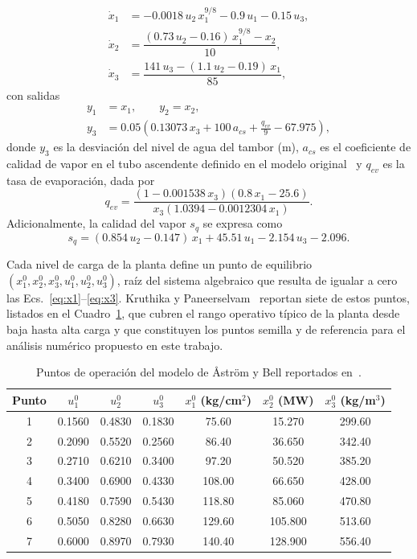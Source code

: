 \documentclass[final,5p,times,twocolumn,authoryear,11pt]{elsarticle}
\begin{document}
\begin{align}
\dot{x}_1 &= -0.0018\,u_2\,x_1^{9/8} - 0.9\,u_1 - 0.15\,u_3, \label{eq:x1} \\[2pt]
\dot{x}_2 &= \dfrac{(0.73\,u_2 - 0.16)\,x_1^{9/8} - x_2}{10}, \label{eq:x2} \\[2pt]
\dot{x}_3 &= \dfrac{141\,u_3 - (1.1\,u_2 - 0.19)\,x_1}{85}, \label{eq:x3}
\end{align}
con salidas
\begin{align}
y_1 &= x_1, \qquad y_2 = x_2, \label{eq:y1y2} \\[2pt]
y_3 &= 0.05\left(0.13073\,x_3 + 100\,a_{cs} + \frac{q_{ev}}{9} - 67.975\right), \label{eq:y3}
\end{align}
donde $y_3$ es la desviación del nivel de agua del tambor (m), $a_{cs}$ es el coeficiente de calidad de vapor en el tubo ascendente definido en el modelo original~\citep{astrom2000drum} y $q_{ev}$ es la tasa de evaporación, dada por
\begin{equation}
q_{ev} = \frac{(1-0.001538\,x_3)(0.8\,x_1 - 25.6)}{x_3(1.0394 - 0.0012304\,x_1)}. \label{eq:qev}
\end{equation}
Adicionalmente, la calidad del vapor $s_q$ se expresa como
\begin{equation}
s_q = (0.854\,u_2 - 0.147)\,x_1 + 45.51\,u_1 - 2.154\,u_3 - 2.096. \label{eq:sq}
\end{equation}

Cada nivel de carga de la planta define un punto de equilibrio $(x_1^0,x_2^0,x_3^0,u_1^0,u_2^0,u_3^0)$, raíz del sistema algebraico que resulta de igualar a cero las Ecs.~\eqref{eq:x1}--\eqref{eq:x3}. Kruthika y Paneerselvam~\citep{kruthika2025novel} reportan siete de estos puntos, listados en el Cuadro~\ref{tab:operating_points}, que cubren el rango operativo típico de la planta desde baja hasta alta carga y que constituyen los puntos semilla y de referencia para el análisis numérico propuesto en este trabajo.

\begin{table}[t]
\centering
\footnotesize
\caption{Puntos de operación del modelo de Åström y Bell reportados en~\citep{kruthika2025novel}.}
\label{tab:operating_points}
\begin{tabular}{ccccccc}
\toprule
Punto & $u_1^0$ & $u_2^0$ & $u_3^0$ & $x_1^0$ (kg/cm$^2$) & $x_2^0$ (MW) & $x_3^0$ (kg/m$^3$) \\
\midrule
1 & 0.1560 & 0.4830 & 0.1830 & 75.60  & 15.270  & 299.60 \\
2 & 0.2090 & 0.5520 & 0.2560 & 86.40  & 36.650  & 342.40 \\
3 & 0.2710 & 0.6210 & 0.3400 & 97.20  & 50.520  & 385.20 \\
4 & 0.3400 & 0.6900 & 0.4330 & 108.00 & 66.650  & 428.00 \\
5 & 0.4180 & 0.7590 & 0.5430 & 118.80 & 85.060  & 470.80 \\
6 & 0.5050 & 0.8280 & 0.6630 & 129.60 & 105.800 & 513.60 \\
7 & 0.6000 & 0.8970 & 0.7930 & 140.40 & 128.900 & 556.40 \\
\bottomrule
\end{tabular}
\end{table}
\end{document}
